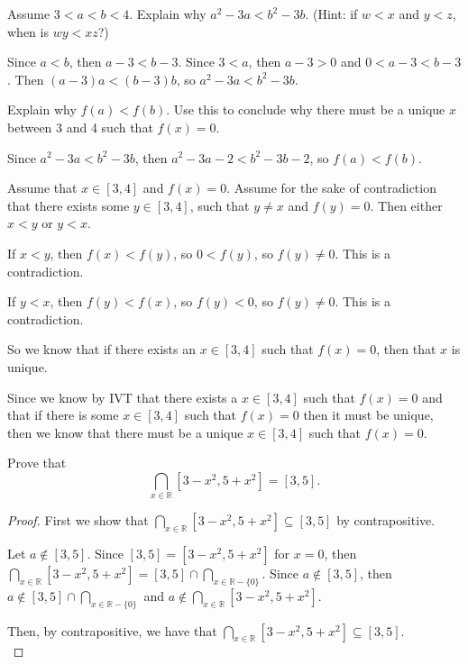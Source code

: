 \documentclass[12 pt]{exam}
\begin{document}
\begin{questions}
\begin{parts}
\item Assume $3<a<b<4$. Explain why $a^2-3a < b^2-3b$.  (Hint: if $w<x$ and $y<z$, when is $wy<xz$?)

\begin{solution}
Since $a < b$, then $a-3 < b-3$. Since $3 < a$, then $a-3 > 0$ and $0 < a-3 < b-3$.
Then $(a-3)a < (b-3)b$, so $a^2 - 3a < b^2 - 3b$.
\end{solution}


\item Explain why $f(a)<f(b)$. Use this to conclude why there must be a unique $x$ between 3 and 4 such that $f(x)=0$. 

\begin{solution}
Since $a^2 - 3a < b^2 - 3b$, then $a^2 - 3a - 2 < b^2 - 3b -2$, so $f(a) < f(b)$.

Assume that $x \in [3, 4]$ and $f(x) = 0$. Assume for the sake of contradiction that there exists some
$y \in [3,4]$, such that $y \ne x$ and $f(y) = 0$. Then either $x < y$ or $y < x$.

If $x < y$, then $f(x) < f(y)$, so $0 < f(y)$, so $f(y) \ne 0$. This is a contradiction.

If $y < x$, then $f(y) < f(x)$, so $f(y) < 0$, so $f(y) \ne 0$. This is a contradiction.

So we know that if there exists an $x \in [3, 4]$ such that $f(x) = 0$, then that $x$ is unique.

Since we know by IVT that there exists a $x \in [3, 4]$ such that $f(x) = 0$ and that if there is some
$x \in [3, 4]$ such that $f(x) = 0$ then it must be unique, then we know that there must be a unique
$x \in [3, 4]$ such that $f(x) = 0$.
\end{solution}
\end{parts}

\question Prove that $$\bigcap_{x \in \mathbb{R}} [3-x^2, 5+x^2 ] =[3,5].$$
\begin{solution}\begin{proof}
    First we show that $\bigcap_{x \in \mathbb{R}} [3-x^2, 5+x^2 ] \subseteq [3,5]$ by contrapositive.

    Let $a \notin [3, 5]$. Since $[3, 5] = [3-x^2, 5+x^2]$ for $x = 0$, then
    $\bigcap_{x \in \mathbb{R}} [3-x^2, 5+x^2] = [3, 5] \cap \bigcap_{x \in \mathbb{R}-\{0\}}$.
    Since $a \notin [3, 5]$, then $a \notin [3, 5] \cap \bigcap_{x \in \mathbb{R}-\{0\}}$
    and $a \notin \bigcap_{x \in \mathbb{R}} [3-x^2, 5+x^2]$.

    Then, by contrapositive, we have that $\bigcap_{x \in \mathbb{R}} [3-x^2, 5+x^2 ] \subseteq [3,5]$.\\



\end{proof}
\end{solution}
\end{questions}
\end{document}
